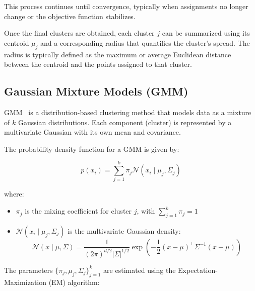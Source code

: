 This process continues until convergence, typically when assignments no longer
change or the objective function stabilizes.

Once the final clusters are obtained, each cluster $j$ can be summarized using
its centroid $\mu_j$ and a corresponding radius that quantifies the cluster’s
spread. The radius is typically defined as the maximum or average Euclidean
distance between the centroid and the points assigned to that cluster.

\subsection*{Gaussian Mixture Models (GMM)}

GMM~\cite{gaussian_mixtures} is a distribution-based clustering method that
models data as a mixture of $k$ Gaussian distributions. Each component
(cluster) is represented by a multivariate Gaussian with its own mean and
covariance.

The probability density function for a GMM is given by:

\begin{equation}
    p(x_i) = \sum_{j=1}^{k} \pi_j \mathcal{N}(x_i \mid \mu_j, \Sigma_j)
\end{equation}

where:
\begin{itemize}
    \item $\pi_j$ is the mixing coefficient for cluster $j$, with $\sum_{j=1}^{k} \pi_j = 1$
    \item $\mathcal{N}(x_i \mid \mu_j, \Sigma_j)$ is the multivariate Gaussian density:
          \begin{equation}
              \mathcal{N}(x \mid \mu, \Sigma) = \frac{1}{(2\pi)^{d/2} |\Sigma|^{1/2}}
              \exp \left( -\frac{1}{2}(x - \mu)^\top \Sigma^{-1} (x - \mu) \right)
          \end{equation}
\end{itemize}

The parameters $\{\pi_j, \mu_j, \Sigma_j\}_{j=1}^k$ are estimated using the
Expectation-Maximization (EM) algorithm:

